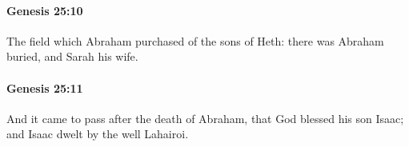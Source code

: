 		\paragraph{Genesis 25:10} %
			\label{GENESIS-25-10}

			The field which Abraham purchased of the sons of Heth: there was Abraham buried, and Sarah his wife.


		\paragraph{Genesis 25:11} %
			\label{GENESIS-25-11}

			And it came to pass after the death of Abraham, that God blessed his son Isaac; and Isaac dwelt by the well Lahairoi.


